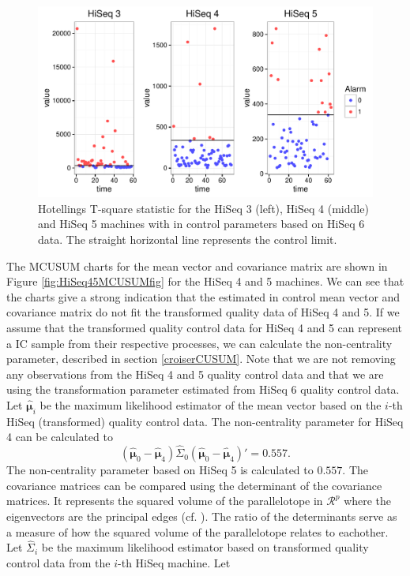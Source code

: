 \documentclass[a4paper,11pt,fleqn,twoside,notitlepage]{report}\usepackage[]{graphicx}\usepackage[]{color}
\makeatletter
\def\maxwidth{ %
  \ifdim\Gin@nat@width>\linewidth
    \linewidth
  \else
    \Gin@nat@width
  \fi
}
\newenvironment{knitrout}{}{} %
\makeatother
\begin{document}
\begin{knitrout}
\color{fgcolor}\begin{figure}[!ht]
\includegraphics[width=\maxwidth]{figure/HiSeqPhase2Hotelling-1} \caption[Hotellings T-square statistic for the HiSeq 3 (left), HiSeq 4 (middle) and HiSeq 5 machines with in control parameters based on HiSeq 6 data]{Hotellings T-square statistic for the HiSeq 3 (left), HiSeq 4 (middle) and HiSeq 5 machines with in control parameters based on HiSeq 6 data. The straight horizontal line represents the control limit.}\label{fig:HiSeqPhase2Hotelling}
\end{figure}


\end{knitrout}
The MCUSUM charts for the mean vector and covariance matrix are shown in Figure \ref{fig:HiSeq45MCUSUMfig} for the HiSeq 4 and 5 machines. We can see that the charts give a strong indication that the estimated in control mean vector and covariance matrix do not fit the transformed quality data of HiSeq 4 and 5. If we assume that the transformed quality control data for HiSeq 4 and 5 can represent a IC sample from their respective processes, we can calculate the non-centrality parameter, described in section \ref{croiserCUSUM}. Note that we are not removing any observations from the HiSeq 4 and 5 quality control data and that we are using the transformation parameter estimated from HiSeq 6 quality control data. Let $\hat{\boldsymbol{\mu}}_{i}$ be the maximum likelihood estimator of the mean vector based on the $i$-th HiSeq (transformed) quality control data. The non-centrality parameter for HiSeq 4 can be calculated to 
$$
(\hat{\boldsymbol{\mu}}_{0}-\hat{\boldsymbol{\mu}}_{4})\widehat{\Sigma}_0(\hat{\boldsymbol{\mu}}_{0}-\hat{\boldsymbol{\mu}}_{4})'=0.557.
$$
The non-centrality parameter based on HiSeq 5 is calculated to $0.557$. The covariance matrices can be compared using the determinant of the covariance matrices. It represents the squared volume of the parallelotope in $\mathcal{R}^p$ where the eigenvectors are the principal edges (cf. \citet[page 385]{MultStatAnalysis}). The ratio of the determinants serve as a measure of how the squared volume of the parallelotope relates to eachother. Let $\widehat{\Sigma}_i$ be the maximum likelihood estimator based on transformed quality control data from the $i$-th HiSeq machine. Let
\end{document}
